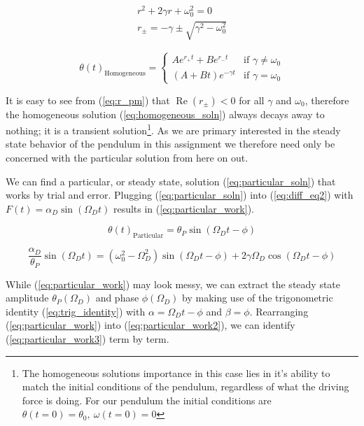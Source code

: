 \documentclass[notitlepage,aps,prd,nofootinbib]{revtex4-1}
\begin{document}
\begin{gather}
r^2 + 2 \gamma r + \omega_{0}^2 = 0 \label{eq:characteristic_eq} \\
r_{\pm} = -\gamma \pm \sqrt{\gamma^2 - \omega_{0}^2} \label{eq:r_pm}
\end{gather}

\begin{equation} \label{eq:homogeneous_soln}
\theta\left(t\right)_{\text{Homogeneous}} =
\begin{cases}
A e^{r_{+} t} + B e^{r_{-} t} & \text{if } \gamma \neq \omega_{0} \\
\left(A + B t\right) e^{-\gamma t} & \text{if } \gamma = \omega_{0}
\end{cases}
\end{equation}

It is easy to see from (\ref{eq:r_pm}) that $\operatorname{Re}\left(r_{\pm}\right) < 0$ for all $\gamma$ and $\omega_{0}$, therefore the homogeneous solution (\ref{eq:homogeneous_soln}) always decays away to nothing; it is a transient solution\footnote{The homogeneous solutions importance in this case lies in it's ability to match the initial conditions of the pendulum, regardless of what the driving force is doing. For our pendulum the initial conditions are $\theta\left(t=0\right)=\theta_{0},~\omega\left(t=0\right)=0$}. As we are primary interested in the steady state behavior of the pendulum in this assignment we therefore need only be concerned with the particular solution from here on out.

We can find a particular, or steady state, solution (\ref{eq:particular_soln}) that works by trial and error. Plugging (\ref{eq:particular_soln}) into (\ref{eq:diff_eq2}) with $F\left(t\right) = \alpha_{D} \sin\left(\Omega_{D} t\right)$ results in (\ref{eq:particular_work}).

\begin{equation} \label{eq:particular_soln}
\theta\left(t\right)_{\text{Particular}} = \theta_{P} \sin\left(\Omega_{D} t - \phi\right)
\end{equation}

\begin{equation} \label{eq:particular_work}
\frac{\alpha_{D}}{\theta_{P}} \sin\left(\Omega_{D} t\right) = \left(\omega_{0}^2 - \Omega_{D}^2\right) \sin\left(\Omega_{D} t - \phi\right) + 2 \gamma \Omega_{D} \cos\left(\Omega_{D} t - \phi\right)
\end{equation}

While (\ref{eq:particular_work}) may look messy, we can extract the steady state amplitude $\theta_{P}\left(\Omega_{D}\right)$ and phase $\phi\left(\Omega_{D}\right)$ by making use of the trigonometric identity (\ref{eq:trig_identity}) with $\alpha = \Omega_{D} t - \phi$ and $\beta = \phi$. Rearranging (\ref{eq:particular_work}) into (\ref{eq:particular_work2}), we can identify (\ref{eq:particular_work3}) term by term.
\end{document}
